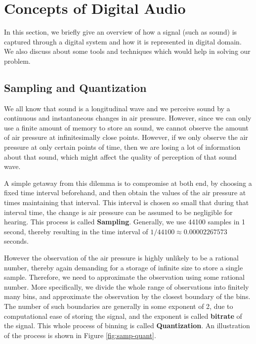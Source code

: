 \documentclass[10pt]{article}
\begin{document}


\section{Concepts of Digital Audio}
\qquad In this section, we briefly give an overview of how a signal (such as sound) is captured through a digital system and how it is represented in digital domain. We also discuss about some tools and techniques which would help in solving our problem.

\subsection{Sampling and Quantization}
\qquad We all know that sound is a longitudinal wave and we perceive sound by a continuous and instantaneous changes in air pressure. However, since we can only use a finite amount of memory to store an sound, we cannot observe the amount of air pressure at infinitesimally close points. However, if we only observe the air pressure at only certain points of time, then we are losing a lot of information about that sound, which might affect the quality of perception of that sound wave. 

A simple getaway from this dilemma is to compromise at both end, by choosing a fixed time interval beforehand, and then obtain the values of the air pressure at times maintaining that interval. This interval is chosen so small that during that interval time, the change is air pressure can be assumed to be negligible for hearing. This process is called \textbf{Sampling}. Generally, we use 44100 samples in 1 second, thereby resulting in the time interval of $1/44100 \approx 0.00002267573$ seconds.

However the observation of the air pressure is highly unlikely to be a rational number, thereby again demanding for a storage of infinite size to store a single sample. Therefore, we need to approximate the observation using some rational number. More specifically, we divide the whole range of observations into finitely many bins, and approximate the observation by the closest boundary of the bins. The number of such boundaries are generally in some exponent of 2, due to computational ease of storing the signal, and the exponent is called \textbf{bitrate} of the signal. This whole process of binning is called \textbf{Quantization}. An illustration of the process is shown in Figure \ref{fig:samp-quant}.
\end{document}

